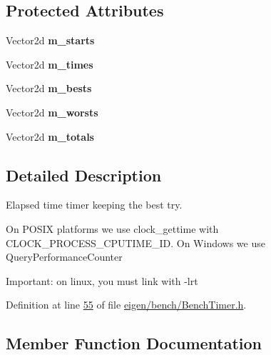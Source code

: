 \subsection*{Protected Attributes}
\begin{DoxyCompactItemize}
\item 
\mbox{\label{class_eigen_1_1_bench_timer_a90c93f01033b77abdb411d1d5caef390}} 
Vector2d {\bfseries m\+\_\+starts}
\item 
\mbox{\label{class_eigen_1_1_bench_timer_a3baa66294d6d1a3db98551cd4205a7db}} 
Vector2d {\bfseries m\+\_\+times}
\item 
\mbox{\label{class_eigen_1_1_bench_timer_a653eb515f6cc22816aaf89168fce1ebd}} 
Vector2d {\bfseries m\+\_\+bests}
\item 
\mbox{\label{class_eigen_1_1_bench_timer_a71546a47136d76cec09512ba8304f046}} 
Vector2d {\bfseries m\+\_\+worsts}
\item 
\mbox{\label{class_eigen_1_1_bench_timer_a11042868e21aa37fb51ca6e02f44bce9}} 
Vector2d {\bfseries m\+\_\+totals}
\end{DoxyCompactItemize}


\subsection{Detailed Description}
Elapsed time timer keeping the best try.

On P\+O\+S\+IX platforms we use clock\+\_\+gettime with C\+L\+O\+C\+K\+\_\+\+P\+R\+O\+C\+E\+S\+S\+\_\+\+C\+P\+U\+T\+I\+M\+E\+\_\+\+ID. On Windows we use Query\+Performance\+Counter

Important\+: on linux, you must link with -\/lrt 

Definition at line \hyperlink{eigen_2bench_2_bench_timer_8h_source_l00055}{55} of file \hyperlink{eigen_2bench_2_bench_timer_8h_source}{eigen/bench/\+Bench\+Timer.\+h}.



\subsection{Member Function Documentation}
\mbox{\label{class_eigen_1_1_bench_timer_ae8b673b0fa356d3432c7a65c79e8af0e}} 
